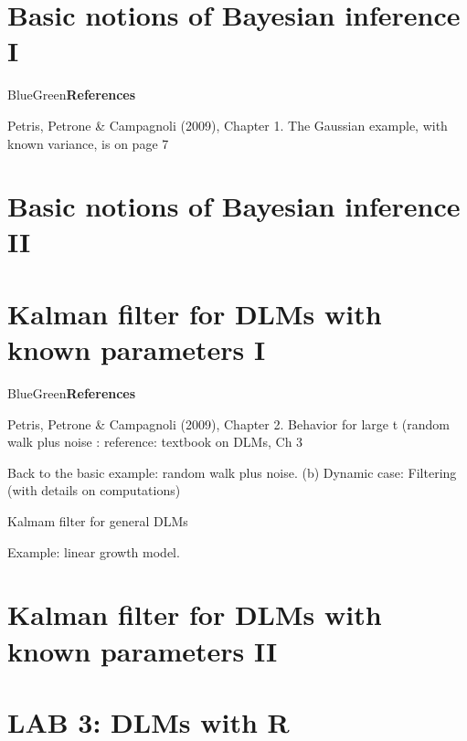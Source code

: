 \documentclass[dvipsnames,12pt]{book}
\begin{document}
    \chapter{Basic notions of Bayesian inference I}

        \begin{mybox}{BlueGreen}{\textbf{References}}

            Petris, Petrone \& Campagnoli (2009), Chapter 1. The Gaussian example, with known variance, is on page 7
            
        \end{mybox}

    \chapter{Basic notions of Bayesian inference II}


    \chapter[Kalman filter for DLMs I]{Kalman filter for DLMs with known parameters I}

        \begin{mybox}{BlueGreen}{\textbf{References}}

            Petris, Petrone \& Campagnoli (2009), Chapter 2.
            Behavior for large t (random walk plus noise : reference: textbook on DLMs, Ch 3
            
        \end{mybox}

        Back to the basic example: random walk plus noise. (b) Dynamic case: Filtering (with details on computations)

        Kalmam filter for general DLMs

        Example: linear growth model.

    \chapter[Kalman filter for DLMs II]{Kalman filter for DLMs with known parameters II}

    \chapter*{LAB 3: DLMs with R}

\end{document}

